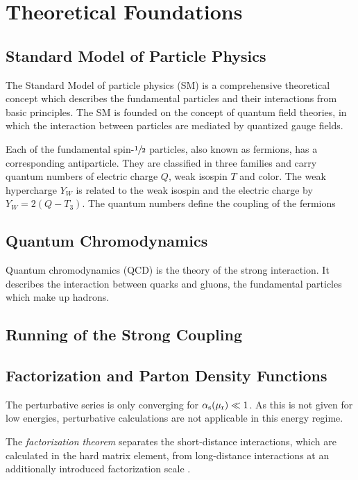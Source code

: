 
\chapter{Theoretical Foundations}

\section{Standard Model of Particle Physics}

The Standard Model of particle physics (SM) is a comprehensive theoretical
concept which describes the fundamental particles and their interactions from
basic principles. The SM is founded on the concept of quantum field theories, in
which the interaction between particles are mediated by quantized gauge fields.

Each of the fundamental spin-$\sfrac{1}{2}$ particles, also known as fermions,
has a corresponding antiparticle. They are classified in three families and
carry quantum numbers of electric charge $Q$, weak isospin $T$ and color. The
weak hypercharge $Y_W$ is related to the weak isospin and the electric charge by
$Y_W = 2(Q-T_3)$. The quantum numbers define the coupling of the fermions

\section{Quantum Chromodynamics}

Quantum chromodynamics (QCD) is the theory of the strong interaction. It
describes the interaction between quarks and gluons, the fundamental particles
which make up hadrons.


\section{Running of the Strong Coupling}


\section{Factorization and Parton Density Functions}

The perturbative series is only converging for $\alpha_\mathrm{s}(\mu_{\mathrm{r}}) \ll 1$. As this is not
given for low energies, perturbative calculations are not applicable in this
energy regime. 

The \emph{factorization theorem} separates the short-distance interactions,
which are calculated in the hard matrix element, from long-distance
interactions at an additionally introduced factorization scale \muf.

